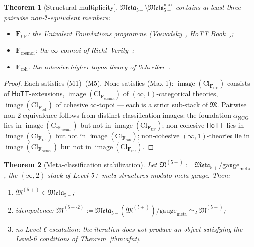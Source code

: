 \documentclass[11pt]{article}
\theoremstyle{plain}
\newtheorem{theorem}{Theorem}[section]
\theoremstyle{definition}
\newcommand{\fM}{\mathfrak{M}}
\newcommand{\Meta}{\mathfrak{Meta}}
\newcommand{\Cl}{\mathrm{Cl}}
\newcommand{\HoTT}{\mathsf{HoTT}}
\DeclareMathOperator{\image}{image}
\begin{document}
\begin{theorem}[Structural multiplicity]\label{thm:meta-mult}
$\Meta_{5+} \setminus \Meta_{5+}^{\max}$ contains at least three pairwise non-$2$-equivalent members:
\begin{itemize}
\item $\mathbf{F}_{\mathrm{UF}}$: the Univalent Foundations programme (Voevodsky~\cite{Voevodsky2010}, HoTT Book~\cite{HoTTBook2013});
\item $\mathbf{F}_{\mathrm{cosmoi}}$: the $\infty$-cosmoi of Riehl--Verity~\cite{RiehlVerity2022};
\item $\mathbf{F}_{\mathrm{coh}}$: the cohesive higher topos theory of Schreiber~\cite{Schreiber2013}.
\end{itemize}
\end{theorem}

\begin{proof}
Each satisfies (M1)--(M5). None satisfies (Max-1): $\image(\Cl_{\mathbf{F}_{\mathrm{UF}}})$ consists of $\HoTT$-extensions, $\image(\Cl_{\mathbf{F}_{\mathrm{cosmoi}}})$ of $(\infty, 1)$-categorical theories, $\image(\Cl_{\mathbf{F}_{\mathrm{coh}}})$ of cohesive $\infty$-topoi --- each is a strict sub-stack of $\fM$. Pairwise non-$2$-equivalence follows from distinct classification images: the foundation $\alpha_{\mathrm{NCG}}$ lies in $\image(\Cl_{\mathbf{F}_{\mathrm{cosmoi}}})$ but not in $\image(\Cl_{\mathbf{F}_{\mathrm{UF}}})$; non-cohesive $\HoTT$ lies in $\image(\Cl_{\mathbf{F}_{\mathrm{UF}}})$ but not in $\image(\Cl_{\mathbf{F}_{\mathrm{coh}}})$; non-cohesive $(\infty, 1)$-theories lie in $\image(\Cl_{\mathbf{F}_{\mathrm{cosmoi}}})$ but not in $\image(\Cl_{\mathbf{F}_{\mathrm{coh}}})$.
\end{proof}

\begin{theorem}[Meta-classification stabilization]\label{thm:meta-stab}
Let $\fM^{(5+)} := \Meta_{5+} / \mathrm{gauge}_{\mathrm{meta}}$, the $(\infty, 2)$-stack of Level 5+ meta-structures modulo meta-gauge. Then:
\begin{enumerate}
\item[(a)] $\fM^{(5+)} \in \Meta_{5+}$;
\item[(b)] idempotence: $\fM^{(5+ \cdot 2)} := \Meta_{5+}(\fM^{(5+)}) / \mathrm{gauge}_{\mathrm{meta}} \simeq_2 \fM^{(5+)}$;
\item[(c)] no Level-6 escalation: the iteration does not produce an object satisfying the Level-6 conditions of Theorem~\ref{thm:afnt}.
\end{enumerate}
\end{theorem}
\end{document}
